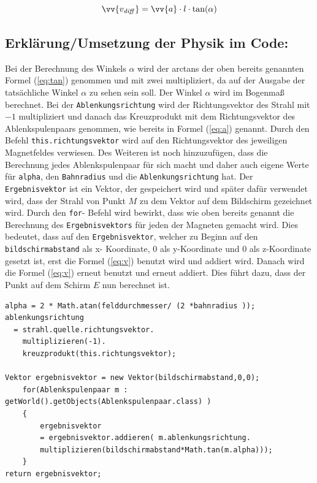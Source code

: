 \begin{equation}
    \label{eq:v}
    \vv{v_\mathit{diff}} =  \vv{a} \cdot l \cdot \tan(\alpha)
\end{equation}

\subsection{Erklärung/Umsetzung der Physik im Code:}

Bei der Berechnung des Winkels $\alpha$ wird der arctans der oben bereits genannten Formel (\ref{eq:tan}) genommen und mit zwei multipliziert, da auf der Ausgabe der tatsächliche Winkel $\alpha$ zu sehen sein soll.
Der Winkel $\alpha$ wird im Bogenmaß berechnet.
Bei der \lstinline$Ablenkungsrichtung$ wird der Richtungsvektor des Strahl mit $-1$ multipliziert und danach das Kreuzprodukt mit dem Richtungsvektor des Ablenkspulenpaars genommen, wie bereits in Formel (\ref{eq:a}) genannt.
Durch den Befehl \lstinline$this.richtungsvektor$ wird auf den Richtungsvektor des jeweiligen Magnetfeldes verwiesen.
Des Weiteren ist noch hinzuzufügen, dass die Berechnung jedes Ablenkspulenpaar für sich macht und daher auch eigene Werte für \lstinline$alpha$, den \lstinline$Bahnradius$ und die \lstinline$Ablenkungsrichtung$ hat.
Der \lstinline$Ergebnisvektor$ ist ein Vektor, der gespeichert wird und später dafür verwendet wird, dass der Strahl von Punkt $M$ zu dem Vektor auf dem Bildschirm gezeichnet wird.
Durch den \lstinline$for$- Befehl wird bewirkt, dass wie oben bereits genannt die Berechnung des \lstinline$Ergebnisvektors$ für jeden der Magneten gemacht wird.
Dies bedeutet, dass auf den \lstinline$Ergebnisvektor$, welcher zu Beginn auf den \lstinline$bildschirmabstand$ als x- Koordinate, $0$ als y-Koordinate und 0 als z-Koordinate gesetzt ist, erst die Formel (\ref{eq:v}) benutzt wird und addiert wird.
Danach wird die Formel (\ref{eq:v}) erneut benutzt und erneut addiert. Dies führt dazu, dass der Punkt auf dem Schirm $E$ nun berechnet ist.

\begin{lstlisting}
alpha = 2 * Math.atan(felddurchmesser/ (2 *bahnradius ));
ablenkungsrichtung
  = strahl.quelle.richtungsvektor.
    multiplizieren(-1).
    kreuzprodukt(this.richtungsvektor);

Vektor ergebnisvektor = new Vektor(bildschirmabstand,0,0);
    for(Ablenkspulenpaar m : getWorld().getObjects(Ablenkspulenpaar.class) )
    {
        ergebnisvektor 
        = ergebnisvektor.addieren( m.ablenkungsrichtung.
        multiplizieren(bildschirmabstand*Math.tan(m.alpha)));
    }
return ergebnisvektor;

\end{lstlisting}

     
